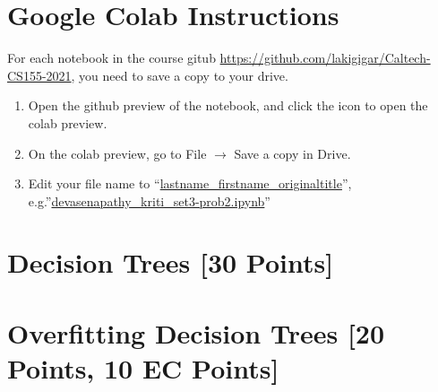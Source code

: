 \section*{Google Colab Instructions}

For each notebook in the course gitub \url{https://github.com/lakigigar/Caltech-CS155-2021}, you need to save a copy to your drive.

\begin{enumerate}
	\item Open the github preview of the notebook, and click the icon to open the colab preview.
	\item On the colab preview, go to File $\rightarrow$ Save a copy in Drive.
	\item Edit your file name to “\url{lastname_firstname_originaltitle}”, e.g.”\url{devasenapathy_kriti_set3-prob2.ipynb}”
\end{enumerate}


\newpage
\section{Decision Trees [30 Points]}


\problem[7]
\begin{solution}
\end{solution}

\problem[4]
\begin{solution}
\end{solution}

\problem[15]
\begin{solution}
\end{solution}

\problem[4]
\begin{solution}
\end{solution}


\newpage


\section{Overfitting Decision Trees [20 Points, 10 EC Points]}

\indent\problem[7] %
\begin{solution}
\end{solution}

\problem[3]
\begin{solution}
\end{solution}

